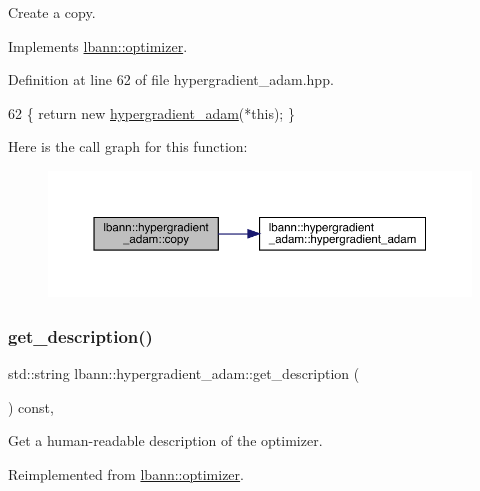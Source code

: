 Create a copy. 

Implements \hyperlink{classlbann_1_1optimizer_adf19a1d19d832ebfe70072cc202cdf39}{lbann\+::optimizer}.



Definition at line 62 of file hypergradient\+\_\+adam.\+hpp.


\begin{DoxyCode}
62 \{ \textcolor{keywordflow}{return} \textcolor{keyword}{new} \hyperlink{classlbann_1_1hypergradient__adam_aefb4d2c307d8f7997624b2ebe977ca3b}{hypergradient\_adam}(*\textcolor{keyword}{this}); \}
\end{DoxyCode}
Here is the call graph for this function\+:\nopagebreak
\begin{figure}[H]
\begin{center}
\leavevmode
\includegraphics[width=350pt]{classlbann_1_1hypergradient__adam_a09a7e0bbae7d18cc94a2f5ad098f1f38_cgraph}
\end{center}
\end{figure}
\mbox{\label{classlbann_1_1hypergradient__adam_aadcd02daeca55493b0e7210195ddb6ec}} 
\subsubsection{\texorpdfstring{get\+\_\+description()}{get\_description()}}
{\footnotesize\ttfamily std\+::string lbann\+::hypergradient\+\_\+adam\+::get\+\_\+description (\begin{DoxyParamCaption}{ }\end{DoxyParamCaption}) const\hspace{0.3cm}{\ttfamily [override]}, {\ttfamily [virtual]}}

Get a human-\/readable description of the optimizer. 

Reimplemented from \hyperlink{classlbann_1_1optimizer_a66bb8d28dfb41452ac1a75a3efd47723}{lbann\+::optimizer}.



